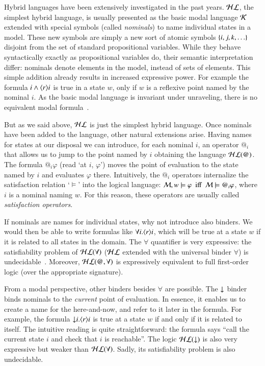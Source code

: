 Hybrid languages have been extensively investigated in the past
years. $\mathcal{HL}$, the simplest hybrid language, is usually presented as
the basic modal language $\mathcal{K}$ extended with special symbols (called
\emph{nominals}) to name individual states in a model. These new
symbols are simply a new sort of atomic symbols
$\{i,j,k,\ldots\}$ disjoint from the set of standard
propositional variables. While they behave syntactically exactly as
propositional variables do, their semantic interpretation differ:
nominals denote elements in the model, instead of sets of elements.
This simple addition already results in increased expressive power.
For example the formula $i \wedge \langle r \rangle i$ is true in a state $w$,
only if $w$ is a reflexive point named by the nominal $i$. As the
basic modal language is invariant under unraveling, there is no
equivalent modal formula~\cite{BRV01}.

But as we said above, $\mathcal{HL}$ is just the simplest hybrid language.
Once nominals have been added to the language, other natural
extensions arise.  Having names for states at our disposal we can
introduce, for each nominal $i$, an operator $@_i$ that allows us to
jump to the point named by $i$ obtaining the language $\mathcal{HL}(@)$. The
formula $@_i\varphi$ (read `at $i$, $\varphi$') moves the point of
evaluation to the state named by $i$ and evaluates $\varphi$ there.
Intuitively, the $@_i$ operators internalize the satisfaction
relation `$\models$' into the logical language: $\mathcal{M}, w \models
\varphi \mbox{ ~iff~ } \mathcal{M} \models @_i\varphi$, where $i$ is a
nominal naming $w$. For this reason, these operators are usually
called \emph{satisfaction operators}.

If nominals are names for individual states, why not introduce also
binders.  We would then be able to write formulas like $\forall
i.\langle r \rangle i$, which will be true at a state $w$ if it is related to
all states in the domain.  The $\forall$ quantifier is very
expressive: the satisfiability problem of $\mathcal{HL}(\forall)$  ($\mathcal{HL}$
extended with the universal binder $\forall$) is
undecidable~\cite{BS95}. Moreover, $\mathcal{HL}(@,\forall)$ is expressively
equivalent to full first-order logic (over the appropriate
signature).

From a modal perspective, other binders besides $\forall$ are
possible.  The ${\downarrow}$ binder binds nominals to the \emph{current}
point of evaluation. In essence, it enables us to create a name for
the here-and-now, and refer to it later in the formula.  For
example, the formula ${\downarrow} i.\langle r \rangle i$ is true at a state $w$ if
and only if it is related to itself.  The intuitive reading is quite
straightforward: the formula says ``call the current state $i$ and
check that $i$ is reachable''.  The logic $\mathcal{HL}({\downarrow})$ is also very
expressive but weaker than $\mathcal{HL}(\forall)$.  Sadly, its
satisfiability problem is also undecidable.

